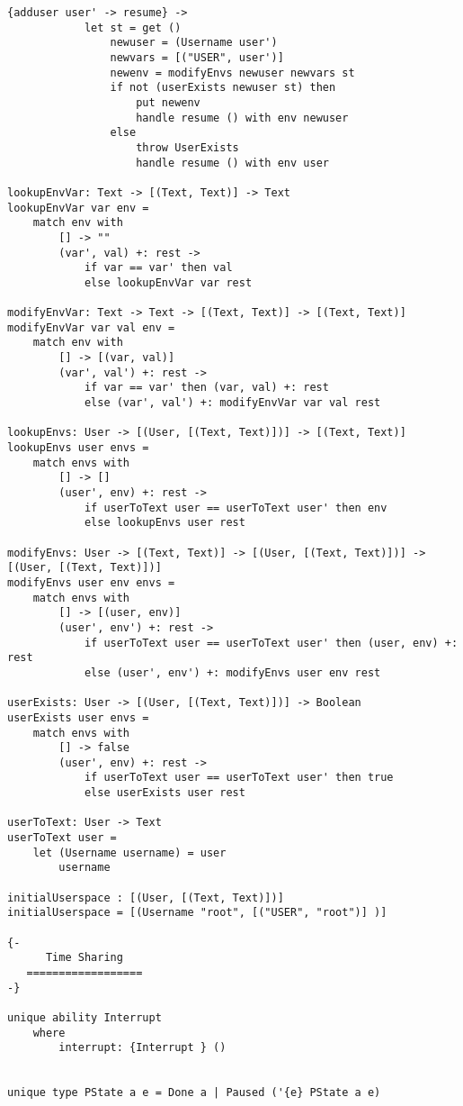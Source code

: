 \documentclass[logo,bsc,singlespacing,parskip]{infthesis}
\begin{document}
\begin{lstlisting}[language=unison]
        {adduser user' -> resume} ->
            let st = get ()
                newuser = (Username user')
                newvars = [("USER", user')]
                newenv = modifyEnvs newuser newvars st
                if not (userExists newuser st) then
                    put newenv
                    handle resume () with env newuser
                else 
                    throw UserExists
                    handle resume () with env user

lookupEnvVar: Text -> [(Text, Text)] -> Text
lookupEnvVar var env =
    match env with
        [] -> ""
        (var', val) +: rest ->
            if var == var' then val
            else lookupEnvVar var rest

modifyEnvVar: Text -> Text -> [(Text, Text)] -> [(Text, Text)]
modifyEnvVar var val env =
    match env with
        [] -> [(var, val)]
        (var', val') +: rest ->
            if var == var' then (var, val) +: rest
            else (var', val') +: modifyEnvVar var val rest

lookupEnvs: User -> [(User, [(Text, Text)])] -> [(Text, Text)]
lookupEnvs user envs =
    match envs with
        [] -> []
        (user', env) +: rest ->
            if userToText user == userToText user' then env
            else lookupEnvs user rest

modifyEnvs: User -> [(Text, Text)] -> [(User, [(Text, Text)])] -> [(User, [(Text, Text)])]
modifyEnvs user env envs =
    match envs with
        [] -> [(user, env)]
        (user', env') +: rest ->
            if userToText user == userToText user' then (user, env) +: rest
            else (user', env') +: modifyEnvs user env rest

userExists: User -> [(User, [(Text, Text)])] -> Boolean
userExists user envs =
    match envs with
        [] -> false
        (user', env) +: rest ->
            if userToText user == userToText user' then true
            else userExists user rest

userToText: User -> Text
userToText user = 
    let (Username username) = user
        username

initialUserspace : [(User, [(Text, Text)])]
initialUserspace = [(Username "root", [("USER", "root")] )]

{-
      Time Sharing
   ==================
-}

unique ability Interrupt
    where
        interrupt: {Interrupt } ()


unique type PState a e = Done a | Paused ('{e} PState a e)


\end{lstlisting}
\end{document}
